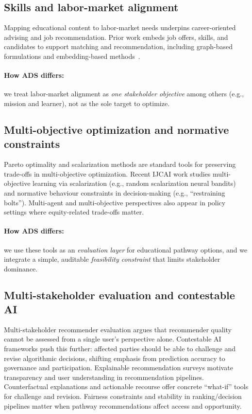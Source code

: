 \documentclass{article}
\begin{document}
\subsection{Skills and labor-market alignment}
Mapping educational content to labor-market needs underpins career-oriented advising and job recommendation. Prior work embeds job offers, skills, and candidates to support matching and recommendation, including graph-based formulations and embedding-based methods~\cite{giabelli2021skills2job,kara2022skillEmbeddings,leon2024transversalSkills}.

\paragraph{How ADS differs:} we treat labor-market alignment as \emph{one stakeholder objective} among others (e.g., mission and learner), not as the sole target to optimize.

\subsection{Multi-objective optimization and normative constraints}
Pareto optimality and scalarization methods are standard tools for preserving trade-offs in multi-objective optimization.\cite{roijers2013survey_mosdm,deb2002nsga2}
Recent IJCAI work studies multi-objective learning via scalarization (e.g., random scalarization neural bandits) and normative behaviour constraints in decision-making (e.g., ``restraining bolts'').\cite{monb2025,restrainingBolts2025}
Multi-agent and multi-objective perspectives also appear in policy settings where equity-related trade-offs matter.\cite{equityMAMORL2025}
\paragraph{How ADS differs:} we use these tools as an \emph{evaluation layer} for educational pathway options, and we integrate a simple, auditable \emph{feasibility constraint} that limits stakeholder dominance.

\subsection{Multi-stakeholder evaluation and contestable AI}
Multi-stakeholder recommender evaluation argues that recommender quality cannot be assessed from a single user's perspective alone.\cite{abdollahpouri2020multistakeholder,burke2025mseval,ge2024trustworthyRS}
Contestable AI frameworks push this further: affected parties should be able to challenge and revise algorithmic decisions, shifting emphasis from prediction accuracy to governance and participation.\cite{aler2020contestable,alfrink2023contestable,dignum2025contesting}
Explainable recommendation surveys motivate transparency and user understanding in recommendation pipelines.\cite{zhang2020explainableRS}
Counterfactual explanations and actionable recourse offer concrete ``what-if'' tools for challenge and revision.\cite{wachter2017counterfactual,ustun2019recourse,robustx2025}
Fairness constraints and stability in ranking/decision pipelines matter when pathway recommendations affect access and opportunity.\cite{ekstrand2019fairness,dwork2012fairness,hardt2016equality,fairRankAgg2025,fairdas2024}
\end{document}
